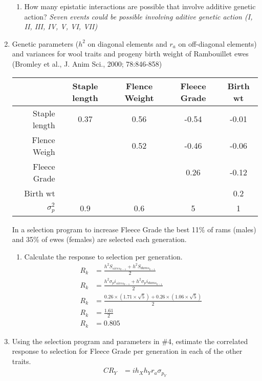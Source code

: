 \documentclass[12pt,a4paper]{paper}
\begin{document}
\begin{enumerate}
\begin{enumerate}
\item How many epistatic interactions are possible that involve additive genetic action?
\textit{Seven events could be possible involving aditive genetic action (I, II, III, IV, V, VI, VII)}
\end{enumerate}
\item Genetic parameters ($h^{2}$ on diagonal elements and $r_{a}$ on off-diagonal elements) and variances for wool traits and progeny birth weight of Rambouillet ewes (Bromley et al., J. Anim Sci., 2000; 78:846-858)
\begin{center}
\begin{tabular}{|r|c|c|c|c|}
\hline
&Staple length&Flence Weight&Fleece Grade&Birth wt\\
\hline
Staple length&0.37&0.56&-0.54&-0.01\\
\hline
Flence Weigh&&0.52&-0.46&-0.06\\
\hline
Fleece Grade&&&0.26&-0.12\\
\hline
Birth wt&&&&0.2\\
\hline
\hline
$\sigma^{2}_{p}$&0.9&0.6&5&1\\
\hline
\end{tabular}
\end{center}
In a selection program to increase Fleece Grade the best 11\% of rams (males) and 35\% of ewes (females) are selected each generation.
\begin{enumerate}
\item Calculate the response to selection per generation.
\begin{equation*}
\begin{split}
R_{k} &= \frac{h^{2}S_{sires_{k-1}}+h^{2}S_{dams_{k-1}}}{2}\\ 
R_{k} &= \frac{h^{2}\sigma_{p}i_{sires_{k-1}}+h^{2}\sigma_{p}i_{dams_{k-1}}}{2}\\
R_{k} &= \frac{0.26 \times (1.71 \times \sqrt{5})+0.26 \times (1.06 \times \sqrt{5})}{2}\\
R_{k} &= \frac{1.61}{2}\\
R_{k} &= 0.805
\end{split}
\end{equation*}
\end{enumerate}
\item Using the selection program and parameters in \#4, estimate the correlated response to selection for Fleece Grade per generation in each of the other traits.
\begin{equation*}
\begin{split}
CR_{Y} &= ih_{X}h_{Y}r_{a}\sigma_{p_{Y}}\\

\end{split}
\end{equation*}
\end{enumerate}
\end{document}
